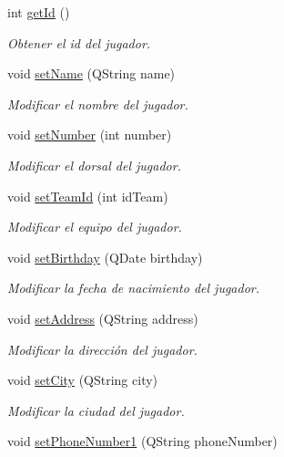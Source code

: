 \begin{DoxyCompactItemize}
int \mbox{\hyperlink{classjugador_ace2ea4097b89df7679c9589dc4d9dd4d}{get\+Id}} ()
\begin{DoxyCompactList}\small\item\em Obtener el id del jugador. \end{DoxyCompactList}\item 
void \mbox{\hyperlink{classjugador_a0dcf58840f95ad87661987f7750c4355}{set\+Name}} (Q\+String name)
\begin{DoxyCompactList}\small\item\em Modificar el nombre del jugador. \end{DoxyCompactList}\item 
void \mbox{\hyperlink{classjugador_aa393b3dfb2eb1f269e66eb0b9e673973}{set\+Number}} (int number)
\begin{DoxyCompactList}\small\item\em Modificar el dorsal del jugador. \end{DoxyCompactList}\item 
void \mbox{\hyperlink{classjugador_ae853f109166a05c832bb89f84cc7408c}{set\+Team\+Id}} (int id\+Team)
\begin{DoxyCompactList}\small\item\em Modificar el equipo del jugador. \end{DoxyCompactList}\item 
void \mbox{\hyperlink{classjugador_ac974fe74ff98272b5652de36e5ba4680}{set\+Birthday}} (Q\+Date birthday)
\begin{DoxyCompactList}\small\item\em Modificar la fecha de nacimiento del jugador. \end{DoxyCompactList}\item 
void \mbox{\hyperlink{classjugador_a1e4da4c657e46c0368f1db72ce102d93}{set\+Address}} (Q\+String address)
\begin{DoxyCompactList}\small\item\em Modificar la dirección del jugador. \end{DoxyCompactList}\item 
void \mbox{\hyperlink{classjugador_ae00869eb01324db252abe1b2df0032bc}{set\+City}} (Q\+String city)
\begin{DoxyCompactList}\small\item\em Modificar la ciudad del jugador. \end{DoxyCompactList}\item 
void \mbox{\hyperlink{classjugador_aaa04ccc1da6c45dea35b723a54e217d4}{set\+Phone\+Number1}} (Q\+String phone\+Number)

\end{DoxyCompactItemize}
